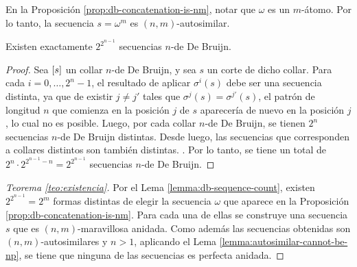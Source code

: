 \documentclass[11pt]{article}
\begin{document}


\begin{remark}
	En la Proposición \ref{prop:db-concatenation-is-nm}, notar que $\omega$ es un
	$m$-átomo. Por lo tanto, la secuencia $s = \omega^m$ es $(n,m)$-autosimilar.
\end{remark}

\begin{lemma}
	\label{lemma:db-sequence-count}
	Existen exactamente $2^{2^{n-1}}$ secuencias $n$-de De Bruijn.
\end{lemma}

\begin{proof}
	Sea $\left[s\right]$ un collar $n$-de De Bruijn, y sea $s$ un corte de dicho
	collar. Para cada $i = 0,\dots,2^n-1$, el resultado de aplicar $\sigma^i(s)$
	debe ser una secuencia distinta, ya que de existir $j \neq j'$ tales que
	$\sigma^j(s) = \sigma^{j'}(s)$, el patrón de longitud $n$ que comienza en la
	posición $j$ de $s$ aparecería de nuevo en la posición $j$, lo cual no es
	posible. Luego, por cada collar $n$-de De Bruijn, se tienen $2^n$ secuencias
	$n$-de De Bruijn distintas. Desde luego, las secuencias que corresponden a
	collares distintos son también distintas.
	.
	Por lo tanto, se tiene un total de
	$2^n \cdot 2^{2^{n-1}-n} = 2^{2^{n-1}}$ secuencias $n$-de De Bruijn.
\end{proof}




\begin{proof}[Teorema \ref{teo:existencia}]
	Por el Lema \ref{lemma:db-sequence-count}, existen $2^{2^{n-1}} = 2^m$ formas
	distintas de elegir la secuencia $\omega$ que aparece en la Proposición
	\ref{prop:db-concatenation-is-nm}. Para cada una de ellas se construye una
	secuencia $s$ que es $(n, m)$-maravillosa anidada. Como además las
	secuencias obtenidas son $(n,m)$-autosimilares y $n > 1$, aplicando el Lema
	\ref{lemma:autosimilar-cannot-be-np}, se tiene que ninguna de las secuencias
	es perfecta anidada.
\end{proof}
\end{document}
